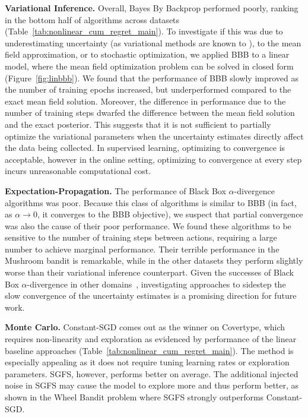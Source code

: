 \documentclass{article} \usepackage{iclr2018_conference,times}
\begin{document}
\textbf{Variational Inference.}
Overall, Bayes By Backprop performed poorly, ranking in the bottom half of algorithms across datasets (Table~\ref{tab:nonlinear_cum_regret_main}). To investigate if this was due to underestimating uncertainty (as variational methods are known to \citep{bishop2006pattern}), to the mean field approximation, or to stochastic optimization, we applied BBB to a linear model, where the mean field optimization problem can be solved in closed form (Figure~\ref{fig:linbbb}). We found that the performance of BBB slowly improved as the number of training epochs increased, but underperformed compared to the exact mean field solution. Moreover, the difference in performance due to the number of training steps dwarfed the difference between the mean field solution and the exact posterior. This suggests that it is not sufficient to partially optimize the variational parameters when the uncertainty estimates directly affect the data being collected. In supervised learning, optimizing to convergence is acceptable, however in the online setting, optimizing to convergence at every step incurs unreasonable computational cost.

\textbf{Expectation-Propagation.}
The performance of Black Box $\alpha$-divergence algorithms was poor. Because this class of algorithms is similar to BBB (in fact, as $\alpha \to 0$, it converges to the BBB objective), we suspect that partial convergence was also the cause of their poor performance. We found these algorithms to be sensitive to the number of training steps between actions, requiring a large number to achieve marginal performance. Their terrible performance in the Mushroom bandit is remarkable, while in the other datasets they perform slightly worse than their variational inference counterpart. Given the successes of Black Box $\alpha$-divergence in other domains~\citep{Hernandez-Lobato2016}, investigating approaches to sidestep the slow convergence of the uncertainty estimates is a promising direction for future work.

\textbf{Monte Carlo.}  Constant-SGD comes out as the winner on Covertype, which requires non-linearity and exploration as evidenced by performance of the linear baseline approaches (Table~\ref{tab:nonlinear_cum_regret_main}).  The method is especially appealing as it does not require tuning learning rates or exploration parameters. SGFS, however, performs better on average.  The additional injected noise in SGFS may cause the model to explore more and thus perform better, as shown in the Wheel Bandit problem where SGFS strongly outperforms Constant-SGD.
\end{document}
